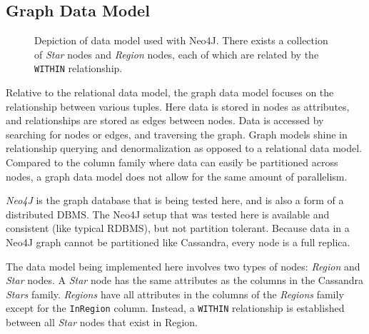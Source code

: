 
\subsection{Graph Data Model}\label{subsec:graphDataModel}
\begin{figure}
    \caption{Depiction of data model used with Neo4J.
    There exists a collection of \textit{Star} nodes and \textit{Region} nodes, each of which are related by the
    \texttt{WITHIN} relationship.}
\end{figure}

Relative to the relational data model, the graph data model focuses on the relationship between various tuples.
Here data is stored in nodes as attributes, and relationships are stored as edges between nodes.
Data is accessed by searching for nodes or edges, and traversing the graph.
Graph models shine in relationship querying and denormalization as opposed to a relational data model.
Compared to the column family where data can easily be partitioned across nodes, a graph data model does not allow
for the same amount of parallelism.

\textit{Neo4J} is the graph database that is being tested here, and is also a form of a distributed DBMS\@.
The Neo4J setup that was tested here is available and consistent (like typical RDBMS), but not partition tolerant.
Because data in a Neo4J graph cannot be partitioned like Cassandra, every node is a full replica.

The data model being implemented here involves two types of nodes: \textit{Region} and \textit{Star} nodes.
A \textit{Star} node has the same attributes as the columns in the Cassandra \textit{Stars} family.
\textit{Regions} have all attributes in the columns of the \textit{Regions} family except for the
\texttt{InRegion} column.
Instead, a \texttt{WITHIN} relationship is established between all \textit{Star} nodes that exist in Region.

